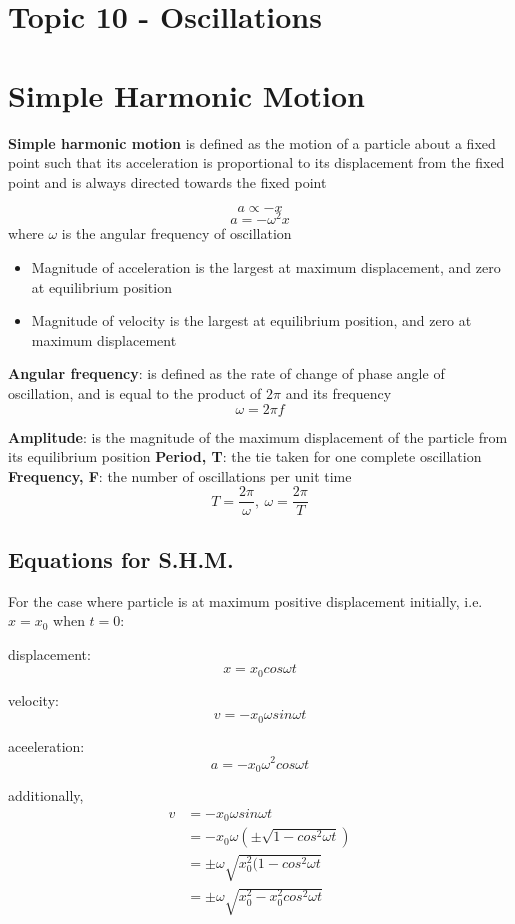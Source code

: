 \documentclass[a4paper, 10pt]{article}
\begin{document}
\section*{Topic 10 - Oscillations}
\section{Simple Harmonic Motion}
\begin{framed}
   \textbf{Simple harmonic motion} is defined as the motion of a particle about a fixed point such that its acceleration is proportional to its displacement from the fixed point and is always directed towards the fixed point

   \[
   a \propto -x
   \]
   \[
   a = -\omega^2 x
   \]
   where $\omega$ is the angular frequency of oscillation
\end{framed}	
\begin{itemize}
   \item Magnitude of acceleration is the largest at maximum displacement, and zero at equilibrium position
   \item Magnitude of velocity is the largest at equilibrium position, and zero at maximum displacement
\end{itemize}	

\textbf{Angular frequency}: is defined as the rate of change of phase angle of oscillation, and is equal to the product of $2\pi$ and its frequency
   \[
   \omega = 2\pi f
   \]

\textbf{Amplitude}: is the magnitude of the maximum displacement of the particle from its equilibrium position 
\textbf{Period, T}: the tie taken for one complete oscillation
\textbf{Frequency, F}: the number of oscillations per unit time
\[
 T = \frac{2\pi}{\omega},\ \omega = \frac{2\pi}{T}
\]

\subsection{Equations for S.H.M.}
For the case where particle is at maximum positive displacement initially, i.e. $x = x_0$ when $t = 0$:

displacement: 
\[
x = x_0 cos \omega t
\]

velocity: 
\[
v = -x_0 \omega sin \omega t
\]

aceeleration:
\[
a = -x_0 \omega^2 cos \omega t
\]

additionally,
\begin{align*}
   v &= -x_0 \omega sin \omega t \\
     &= -x_0 \omega \left( \pm  \sqrt{1 - cos^2 \omega t} \right) \\
     &= \pm \omega \sqrt{x_0^2 (1 - cos^2 \omega t} \\
     &= \pm \omega \sqrt{x_0^2 - x_0^2 cos^2 \omega t} \\
\end{align*}	
\end{document}
